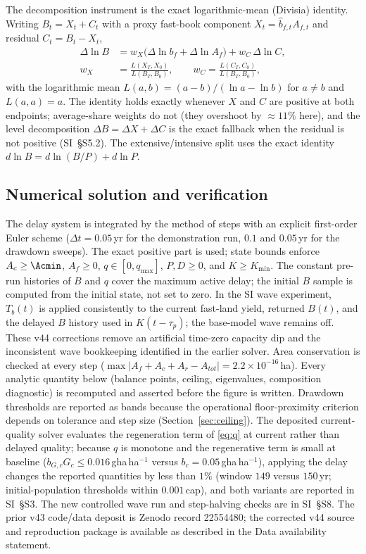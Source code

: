 The decomposition instrument is the exact logarithmic-mean (Divisia) identity. Writing $B_t=X_t+C_t$ with a proxy fast-book component $X_t=\hat b_{f,t}A_{f,t}$ and residual $C_t=B_t-X_t$,
\begin{equation}\label{eq:divisia}
\begin{split}
\Delta\ln B&=w_X\big(\Delta\ln b_f+\Delta\ln A_f\big)+w_C\,\Delta\ln C,\\
w_X&=\frac{L(X_T,X_0)}{L(B_T,B_0)},\qquad w_C=\frac{L(C_T,C_0)}{L(B_T,B_0)},
\end{split}
\end{equation}
with the logarithmic mean $L(a,b)=(a-b)/(\ln a-\ln b)$ for $a\neq b$ and $L(a,a)=a$. The identity holds exactly whenever $X$ and $C$ are positive at both endpoints; average-share weights do not (they overshoot by $\approx11\%$ here), and the level decomposition $\Delta B=\Delta X+\Delta C$ is the exact fallback when the residual is not positive (SI~\S S5.2). The extensive/intensive split uses the exact identity $d\ln B=d\ln(B/P)+d\ln P$.

\subsection{Numerical solution and verification}\label{sec:numerics}

The delay system is integrated by the method of steps with an explicit first-order Euler scheme ($\Delta t=0.05$\,yr for the demonstration run, $0.1$ and $0.05$\,yr for the drawdown sweeps). The exact positive part is used; state bounds enforce $A_c\ge\Acmin$, $A_f\ge0$, $q\in[0,q_{\max}]$, $P,D\ge0$, and $K\ge K_{\min}$. The constant pre-run histories of $B$ and $q$ cover the maximum active delay; the initial $B$ sample is computed from the initial state, not set to zero. In the SI wave experiment, $T_b(t)$ is applied consistently to the current fast-land yield, returned $B(t)$, and the delayed $B$ history used in $K(t-\tau_p)$; the base-model wave remains off. These v44 corrections remove an artificial time-zero capacity dip and the inconsistent wave bookkeeping identified in the earlier solver. Area conservation is checked at every step ($\max|A_f+A_c+A_r-A_{tot}|=2.2\times10^{-16}$\,ha). Every analytic quantity below (balance points, ceiling, eigenvalues, composition diagnostic) is recomputed and asserted before the figure is written. Drawdown thresholds are reported as bands because the operational floor-proximity criterion depends on tolerance and step size (Section~\ref{sec:ceiling}). The deposited current-quality solver evaluates the regeneration term of \eqref{eq:q} at current rather than delayed quality; because $q$ is monotone and the regenerative term is small at baseline ($b_{G,c}G_c\le0.016$\,gha\,ha$^{-1}$ versus $b_c=0.05$\,gha\,ha$^{-1}$), applying the delay changes the reported quantities by less than $1\%$ (window $149$ versus $150$\,yr; initial-population thresholds within $0.001$\,cap), and both variants are reported in SI~\S S3. The new controlled wave run and step-halving checks are in SI~\S S8. The prior v43 code/data deposit is Zenodo record 22554480; the corrected v44 source and reproduction package is available as described in the Data availability statement.
